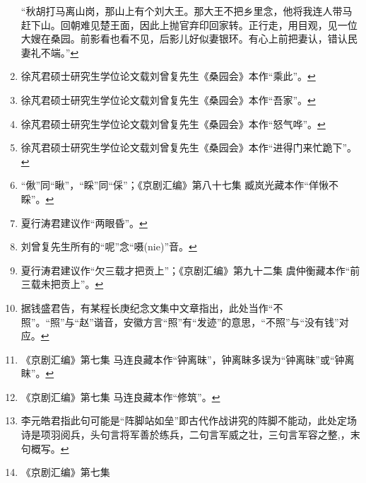 \begin{enumerate}
  ``秋胡打马离山岗，那山上有个刘大王。那大王不把乡里念，他将我连人带马赶下山。回朝难见楚王面，因此上抛官弃印回家转。正行走，用目观，见一位大嫂在桑园。前影看也看不见，后影儿好似妻银环。有心上前把妻认，错认民妻礼不端。''\protect\hyperlink{fnref85}{↩}
\item
  \leavevmode\hypertarget{fn86}{}%
  徐芃君硕士研究生学位论文载刘曾复先生《桑园会》本作``乘此''。\protect\hyperlink{fnref86}{↩}
\item
  \leavevmode\hypertarget{fn87}{}%
  徐芃君硕士研究生学位论文载刘曾复先生《桑园会》本作``吾家''。\protect\hyperlink{fnref87}{↩}
\item
  \leavevmode\hypertarget{fn88}{}%
  徐芃君硕士研究生学位论文载刘曾复先生《桑园会》本作``怒气哗''。\protect\hyperlink{fnref88}{↩}
\item
  \leavevmode\hypertarget{fn89}{}%
  徐芃君硕士研究生学位论文载刘曾复先生《桑园会》本作``进得门来忙跪下''。\protect\hyperlink{fnref89}{↩}
\item
  \leavevmode\hypertarget{fn90}{}%
  ``偢''同``瞅''，``睬''同``倸''；《京剧汇编》第八十七集
  臧岚光藏本作``佯愀不睬''。\protect\hyperlink{fnref90}{↩}
\item
  \leavevmode\hypertarget{fn91}{}%
  夏行涛君建议作``两眼昏''。\protect\hyperlink{fnref91}{↩}
\item
  \leavevmode\hypertarget{fn92}{}%
  刘曾复先生所有的``呢''念``嗫(nie)''音。\protect\hyperlink{fnref92}{↩}
\item
  \leavevmode\hypertarget{fn93}{}%
  夏行涛君建议作``欠三载才把贡上''；《京剧汇编》第九十二集
  虞仲衡藏本作``前三载未把贡上''。\protect\hyperlink{fnref93}{↩}
\item
  \leavevmode\hypertarget{fn94}{}%
  据钱盛君告，有某程长庚纪念文集中文章指出，此处当作``不照''。``照''与``赵''谐音，安徽方言``照''有``发迹''的意思，``不照''与``没有钱''对应。\protect\hyperlink{fnref94}{↩}
\item
  \leavevmode\hypertarget{fn95}{}%
  《京剧汇编》第七集
  马连良藏本作``钟离昧''，钟离眛多误为``钟离昧''或``钟离眜''。\protect\hyperlink{fnref95}{↩}
\item
  \leavevmode\hypertarget{fn96}{}%
  《京剧汇编》第七集
  马连良藏本作``修筑''。\protect\hyperlink{fnref96}{↩}
\item
  \leavevmode\hypertarget{fn97}{}%
  李元皓君指此句可能是``阵脚站如垒''即古代作战讲究的阵脚不能动，此处定场诗是项羽阅兵，头句言将军善於练兵，二句言军威之壮，三句言军容之整,，末句概写。\protect\hyperlink{fnref97}{↩}
\item
  \leavevmode\hypertarget{fn98}{}%
  《京剧汇编》第七集

\end{enumerate}
